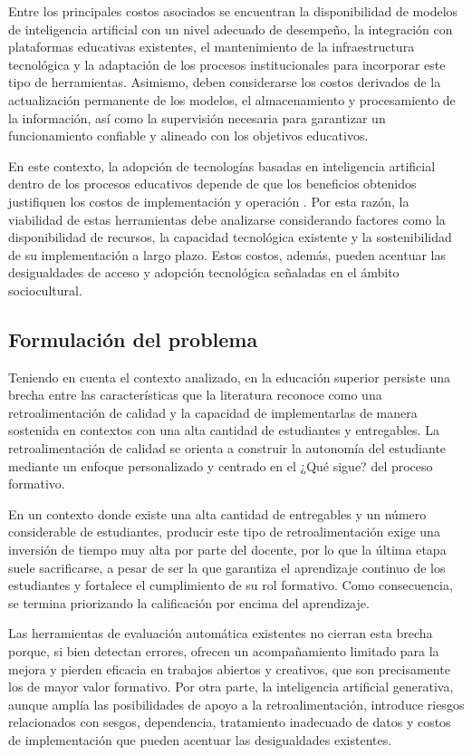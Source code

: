 \documentclass[letterpaper, 10 pt, conference]{ieeeconf}  %
\begin{document}
    Entre los principales costos asociados se encuentran la disponibilidad de modelos de inteligencia artificial con un nivel adecuado de desempeño, la integración con plataformas educativas existentes, el mantenimiento de la infraestructura tecnológica y la adaptación de los procesos institucionales para incorporar este tipo de herramientas. Asimismo, deben considerarse los costos derivados de la actualización permanente de los modelos, el almacenamiento y procesamiento de la información, así como la supervisión necesaria para garantizar un funcionamiento confiable y alineado con los objetivos educativos.

    En este contexto, la adopción de tecnologías basadas en inteligencia artificial dentro de los procesos educativos depende de que los beneficios obtenidos justifiquen los costos de implementación y operación \cite{24}. Por esta razón, la viabilidad de estas herramientas debe analizarse considerando factores como la disponibilidad de recursos, la capacidad tecnológica existente y la sostenibilidad de su implementación a largo plazo. Estos costos, además, pueden acentuar las desigualdades de acceso y adopción tecnológica señaladas en el ámbito sociocultural.


    \subsection{Formulación del problema}
    Teniendo en cuenta el contexto analizado, en la educación superior persiste una brecha entre las características que la literatura reconoce como una retroalimentación de calidad y la capacidad de implementarlas de manera sostenida en contextos con una alta cantidad de estudiantes y entregables. La retroalimentación de calidad se orienta a construir la autonomía del estudiante mediante un enfoque personalizado y centrado en el ¿Qué sigue? del proceso formativo.

    En un contexto donde existe una alta cantidad de entregables y un número considerable de estudiantes, producir este tipo de retroalimentación exige una inversión de tiempo muy alta por parte del docente, por lo que la última etapa suele sacrificarse, a pesar de ser la que garantiza el aprendizaje continuo de los estudiantes y fortalece el cumplimiento de su rol formativo. Como consecuencia, se termina priorizando la calificación por encima del aprendizaje.

    Las herramientas de evaluación automática existentes no cierran esta brecha porque, si bien detectan errores, ofrecen un acompañamiento limitado para la mejora y pierden eficacia en trabajos abiertos y creativos, que son precisamente los de mayor valor formativo. Por otra parte, la inteligencia artificial generativa, aunque amplía las posibilidades de apoyo a la retroalimentación, introduce riesgos relacionados con sesgos, dependencia, tratamiento inadecuado de datos y costos de implementación que pueden acentuar las desigualdades existentes.
\end{document}
